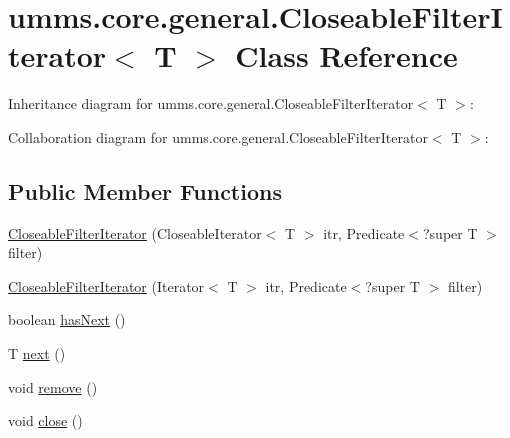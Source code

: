 \hypertarget{classumms_1_1core_1_1general_1_1_closeable_filter_iterator_3_01_t_01_4}{\section{umms.\+core.\+general.\+Closeable\+Filter\+Iterator$<$ T $>$ Class Reference}
\label{classumms_1_1core_1_1general_1_1_closeable_filter_iterator_3_01_t_01_4}
}


Inheritance diagram for umms.\+core.\+general.\+Closeable\+Filter\+Iterator$<$ T $>$\+:


Collaboration diagram for umms.\+core.\+general.\+Closeable\+Filter\+Iterator$<$ T $>$\+:
\subsection*{Public Member Functions}
\begin{DoxyCompactItemize}
\item 
\hyperlink{classumms_1_1core_1_1general_1_1_closeable_filter_iterator_3_01_t_01_4_a9cdca39896a41041469d8c1c7910dbcd}{Closeable\+Filter\+Iterator} (Closeable\+Iterator$<$ T $>$ itr, Predicate$<$?super T $>$ filter)
\item 
\hyperlink{classumms_1_1core_1_1general_1_1_closeable_filter_iterator_3_01_t_01_4_a3d347e64e6abc36babab1ab78c1bfec7}{Closeable\+Filter\+Iterator} (Iterator$<$ T $>$ itr, Predicate$<$?super T $>$ filter)
\item 
boolean \hyperlink{classumms_1_1core_1_1general_1_1_closeable_filter_iterator_3_01_t_01_4_aa1f47ebc9f38272427cd27d6ec6dc536}{has\+Next} ()
\item 
T \hyperlink{classumms_1_1core_1_1general_1_1_closeable_filter_iterator_3_01_t_01_4_a327bf3a492c1ea91ff045ac1ca802def}{next} ()
\item 
void \hyperlink{classumms_1_1core_1_1general_1_1_closeable_filter_iterator_3_01_t_01_4_a0de5f2addc310db6a7470fcd7ac07007}{remove} ()
\item 
void \hyperlink{classumms_1_1core_1_1general_1_1_closeable_filter_iterator_3_01_t_01_4_a4e5c6d33f6182d12d6ccca55ea651336}{close} ()
\end{DoxyCompactItemize}



